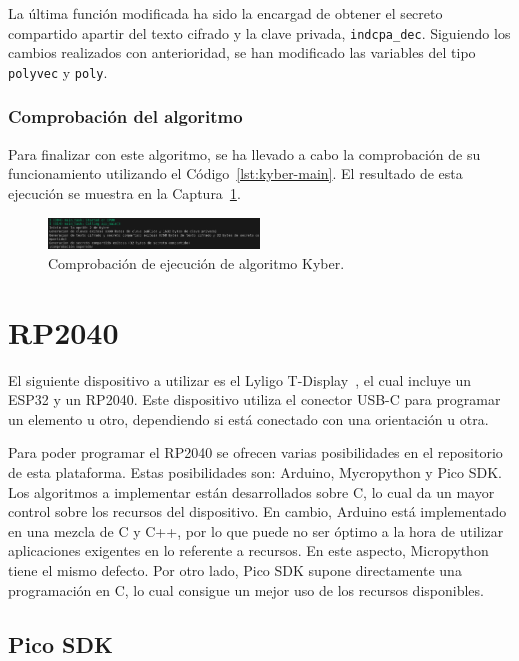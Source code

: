 La última función modificada ha sido la encargad de obtener el secreto compartido apartir del texto cifrado y la clave privada, \texttt{indcpa\_dec}.
Siguiendo los cambios realizados con anterioridad, se han modificado las variables del tipo \texttt{polyvec} y \texttt{poly}.

\subsubsection{Comprobación del algoritmo}\label{subsubsec:kyber-compro}

Para finalizar con este algoritmo, se ha llevado a cabo la comprobación de su funcionamiento utilizando el Código~\ref{lst:kyber-main}.
El resultado de esta ejecución se muestra en la Captura~\ref{fig:kyber-check}.

\begin{figure}[h]
    \centering
    \includegraphics[width=0.5\textwidth]{figures/kyber-check.png}
    \caption{Comprobación de ejecución de algoritmo Kyber.}
    \label{fig:kyber-check}
\end{figure}




\section{RP2040}\label{sec:rp2040}

El siguiente dispositivo a utilizar es el Lyligo T-Display~\cite{lilygo}, el cual incluye un ESP32 y un RP2040.
Este dispositivo utiliza el conector USB-C para programar un elemento u otro, dependiendo si está conectado con una orientación u otra.

Para poder programar el RP2040 se ofrecen varias posibilidades en el repositorio de esta plataforma.
Estas posibilidades son: Arduino, Mycropython y Pico SDK.
Los algoritmos a implementar están desarrollados sobre C, lo cual da un mayor control sobre los recursos del dispositivo.
En cambio, Arduino está implementado en una mezcla de C y C++, por lo que puede no ser óptimo a la hora de utilizar aplicaciones exigentes en lo referente a recursos.
En este aspecto, Micropython tiene el mismo defecto.
Por otro lado, Pico SDK supone directamente una programación en C, lo cual consigue un mejor uso de los recursos disponibles.


\subsection{Pico SDK}\label{subsec:pico-sdk}

